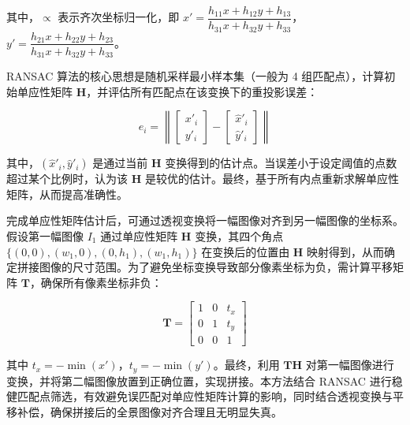 \documentclass[a4paper, utf8]{ctexart}
\begin{document}
	\vspace{.3em}
	
	其中，$\propto$ 表示齐次坐标归一化，即 $x' = \dfrac{h_{11} x + h_{12} y + h_{13}}{h_{31} x + h_{32} y + h_{33}}$，$y' = \dfrac{h_{21} x + h_{22} y + h_{23}}{h_{31} x + h_{32} y + h_{33}}$。
	
	\vspace{.3em}
	
	RANSAC 算法的核心思想是随机采样最小样本集（一般为 4 组匹配点），计算初始单应性矩阵 $\mathbf{H}$，并评估所有匹配点在该变换下的重投影误差：
	
	\vspace{-.5em}
	\begin{equation}
	    e_i = \left\| \begin{bmatrix} x'_i \\ y'_i \end{bmatrix} - \begin{bmatrix} \hat{x}'_i \\ \hat{y}'_i \end{bmatrix} \right\|
	\end{equation}
	
	其中，$(\hat{x}'_i, \hat{y}'_i)$ 是通过当前 $\mathbf{H}$ 变换得到的估计点。当误差小于设定阈值的点数超过某个比例时，认为该 $\mathbf{H}$ 是较优的估计。最终，基于所有内点重新求解单应性矩阵，从而提高准确性。
	
	完成单应性矩阵估计后，可通过透视变换将一幅图像对齐到另一幅图像的坐标系。假设第一幅图像 $I_1$ 通过单应性矩阵 $\mathbf{H}$ 变换，其四个角点 $\{ (0,0), (w_1,0), (0,h_1), (w_1,h_1) \}$ 在变换后的位置由 $\mathbf{H}$ 映射得到，从而确定拼接图像的尺寸范围。为了避免坐标变换导致部分像素坐标为负，需计算平移矩阵 $\mathbf{T}$，确保所有像素坐标非负：
	
	\vspace{-.5em}
	\begin{equation}
	    \mathbf{T} = \begin{bmatrix} 1 & 0 & t_x \\
	                               0 & 1 & t_y \\
	                               0 & 0 & 1 \end{bmatrix}
	\end{equation}
	
	其中 $t_x = -\min(x')$，$t_y = -\min(y')$。最终，利用 $\mathbf{T}\mathbf{H}$ 对第一幅图像进行变换，并将第二幅图像放置到正确位置，实现拼接。本方法结合 RANSAC 进行稳健匹配点筛选，有效避免误匹配对单应性矩阵计算的影响，同时结合透视变换与平移补偿，确保拼接后的全景图像对齐合理且无明显失真。
	
\end{document}
